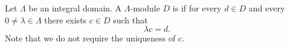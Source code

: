 Let $\Lambda$ be an integral domain. A $\Lambda$-module $D$ is  if for every $d \in D$ and every $0 \neq \lambda \in \Lambda$ there exists $c \in D$ such that
$$\lambda c = d.$$
Note that we do not require the uniqueness of $c$.
